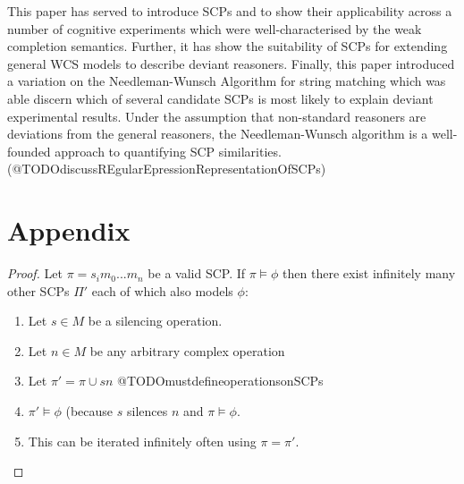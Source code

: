 \documentclass{article}
\newtheorem{proof}{Proof}
\begin{document}
This paper has served to introduce SCPs and to show their applicability across a number of cognitive experiments which were well-characterised by the weak completion semantics. Further, it has show the suitability of SCPs for extending general WCS models to describe deviant reasoners. Finally, this paper introduced a variation on the Needleman-Wunsch Algorithm for string matching which was able discern which of several candidate SCPs is most likely to explain deviant experimental results. Under the assumption that non-standard reasoners are deviations from the general reasoners, the Needleman-Wunsch algorithm is a well-founded approach to quantifying SCP similarities. (@TODOdiscussREgularEpressionRepresentationOfSCPs)

\newpage
	



\newpage
\section*{Appendix}
\begin{proof}
Let $\pi = s_i m_0 ... m_n$ be a valid SCP. If $\pi \models \phi$ then there exist infinitely many other SCPs $\Pi'$ each of which also models $\phi$:

\begin{enumerate}
\item Let $s \in M$ be a silencing operation.
\item  Let $n \in M$ be any arbitrary complex operation
\item Let $\pi'= \pi \cup sn$ @TODOmustdefineoperationsonSCPs
\item $\pi' \models \phi$ (because $s$ silences $n$ and $\pi \models \phi$. 
\item This can be iterated infinitely often using $\pi = \pi'$.
\end{enumerate}

\label{prf:infinitelyLong}
\end{proof}
\end{document}
